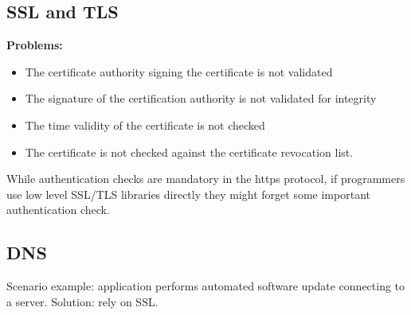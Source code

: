 \documentclass[10pt,a4paper]{article}
\begin{document}
\subsection{SSL and TLS}
\textbf{Problems:}
\begin{itemize}
\item The certificate authority signing the certificate is not validated
\item The signature of the certification authority is not validated for integrity
\item The time validity of the certificate is not checked
\item The certificate is not checked against the certificate revocation list.
\end{itemize}
While authentication checks are mandatory in the https protocol, if programmers use low level SSL/TLS libraries directly they might forget some important authentication check.
\subsection{DNS}
Scenario example: application performs automated software update connecting to a server. Solution: rely on SSL.
\end{document}

